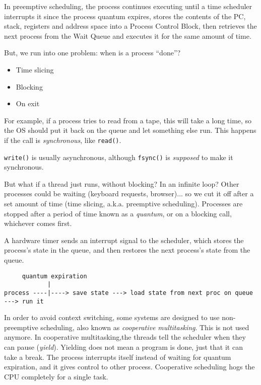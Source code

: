 \documentclass[twoside]{article}
\begin{document}
In preemptive scheduling, the process continues executing until a time scheduler interrupts it since the process quantum expires, stores the contents of the PC, stack, registers and address space into a Process Control Block, then retrieves the next process from the Wait Queue and executes it for the same amount of time.

But, we run into one problem: when is a process ``done''?

\begin{itemize}
  \item Time slicing
  \item Blocking
  \item On exit
\end{itemize}

For example, if a process tries to read from a tape, this will take a long time, so the OS should put it back on the queue and let something else run. This happens if the call is \textit{synchronous}, like \texttt{read()}.

\texttt{write()} is usually asynchronous, although \texttt{fsync()} is \emph{supposed} to make it synchronous.

But what if a thread just runs, without blocking? In an infinite loop? Other processes could be waiting (keyboard requests, browser)... so we cut it off after a set amount of time (time slicing, a.k.a. preemptive scheduling). Processes are stopped after a period of time known as a \textit{quantum}, or on a blocking call, whichever comes first.

A hardware timer sends an interrupt signal to the scheduler, which stores the process's state in the queue, and then restores the next process's state from the queue.

\begin{verbatim}
     quantum expiration
            |
process ----|----> save state ---> load state from next proc on queue ---> run it
\end{verbatim}

In order to avoid context switching, some systems are designed to use non-preemptive scheduling, also known as \textit{cooperative multitasking}. This is not used anymore. In cooperative multitasking,the threads tell the scheduler when they can pause (\textit{yield}). Yielding does not mean a program is done, just that it can take a break. The process interrupts itself instead of waiting for quantum expiration, and it gives control to other process. Cooperative scheduling hogs the CPU completely for a single task.
\end{document}
